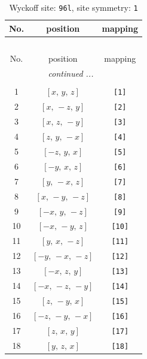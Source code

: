 \documentclass[fleqn,8pt]{jsarticle}
\begin{document}
\begin{longtable}{ccc}
\caption{Wyckoff site: {\tt 96l}, site symmetry: {\tt 1}}
 \\
 \hline \hline
No. & position & mapping \\ \hline \endfirsthead

\multicolumn{2}{l}{\tablename\ \thetable{}} \\
 \hline \hline
No. & position & mapping \\ \hline \endhead

 \hline \hline
\multicolumn{2}{r}{\footnotesize\it continued ...} \\ \endfoot

 \hline \hline
\multicolumn{2}{r}{} \\ \endlastfoot

1 & $\left[ x,\, y,\, z \right]$ & {\tt [1]} \\ \hline
2 & $\left[ x,\, - z,\, y \right]$ & {\tt [2]} \\ \hline
3 & $\left[ x,\, z,\, - y \right]$ & {\tt [3]} \\ \hline
4 & $\left[ z,\, y,\, - x \right]$ & {\tt [4]} \\ \hline
5 & $\left[ - z,\, y,\, x \right]$ & {\tt [5]} \\ \hline
6 & $\left[ - y,\, x,\, z \right]$ & {\tt [6]} \\ \hline
7 & $\left[ y,\, - x,\, z \right]$ & {\tt [7]} \\ \hline
8 & $\left[ x,\, - y,\, - z \right]$ & {\tt [8]} \\ \hline
9 & $\left[ - x,\, y,\, - z \right]$ & {\tt [9]} \\ \hline
10 & $\left[ - x,\, - y,\, z \right]$ & {\tt [10]} \\ \hline
11 & $\left[ y,\, x,\, - z \right]$ & {\tt [11]} \\ \hline
12 & $\left[ - y,\, - x,\, - z \right]$ & {\tt [12]} \\ \hline
13 & $\left[ - x,\, z,\, y \right]$ & {\tt [13]} \\ \hline
14 & $\left[ - x,\, - z,\, - y \right]$ & {\tt [14]} \\ \hline
15 & $\left[ z,\, - y,\, x \right]$ & {\tt [15]} \\ \hline
16 & $\left[ - z,\, - y,\, - x \right]$ & {\tt [16]} \\ \hline
17 & $\left[ z,\, x,\, y \right]$ & {\tt [17]} \\ \hline
18 & $\left[ y,\, z,\, x \right]$ & {\tt [18]} \\ \hline

\end{longtable}
\end{document}

